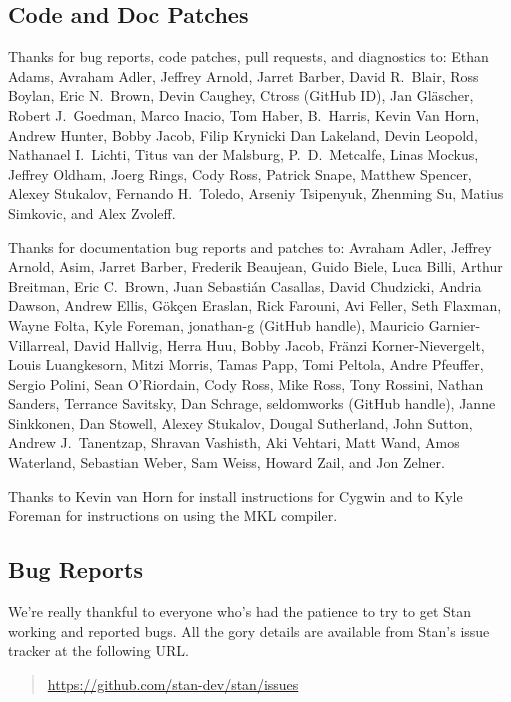 \subsection*{Code  and Doc Patches}

Thanks for bug reports, code patches, pull requests, and diagnostics
to: 
Ethan Adams, 
Avraham Adler,
Jeffrey Arnold, 
Jarret Barber, 
David R.~Blair, 
Ross Boylan, 
Eric N.~Brown, 
Devin Caughey, 
Ctross (GitHub ID), 
Jan Gl\"ascher,
Robert J.\ Goedman, 
Marco Inacio, 
Tom Haber,
B.~Harris, 
Kevin Van Horn, 
Andrew Hunter,
Bobby Jacob, 
Filip Krynicki
Dan Lakeland, 
Devin Leopold, 
Nathanael I.~Lichti,
Titus van der Malsburg,
P.~D.~Metcalfe, 
Linas Mockus,
Jeffrey Oldham, 
Joerg Rings,
Cody Ross,
Patrick Snape,
Matthew Spencer,
Alexey Stukalov,
Fernando H.~Toledo, 
Arseniy Tsipenyuk,
Zhenming Su,
Matius Simkovic, and
Alex Zvoleff.

Thanks for documentation bug reports and patches to: 
Avraham Adler,
Jeffrey Arnold,
Asim, 
Jarret Barber, 
Frederik Beaujean,
Guido Biele,
Luca Billi, 
Arthur Breitman,
Eric C.~Brown, 
Juan Sebasti\'an Casallas,
David Chudzicki,
Andria Dawson, 
Andrew Ellis,
G\"{o}k\c{c}en Eraslan,
Rick Farouni,
Avi Feller,
Seth Flaxman, 
Wayne Folta, 
Kyle Foreman,
jonathan-g (GitHub handle),
Mauricio Garnier-Villarreal,
David Hallvig,
Herra Huu,
Bobby Jacob,
Fr\"anzi Korner-Nievergelt,
Louis Luangkesorn, 
Mitzi Morris,
Tamas Papp, 
Tomi Peltola,
Andre Pfeuffer,
Sergio Polini,
Sean O'Riordain, 
Cody Ross, 
Mike Ross, 
Tony Rossini,
Nathan Sanders, 
Terrance Savitsky,
Dan Schrage,
seldomworks (GitHub handle),
Janne Sinkkonen, 
Dan Stowell, 
Alexey Stukalov,
Dougal Sutherland, 
John Sutton,
Andrew J.~Tanentzap,
Shravan Vashisth, 
Aki Vehtari,
Matt Wand,
Amos Waterland,
Sebastian Weber, 
Sam Weiss,
Howard Zail, and
Jon Zelner.

Thanks to Kevin van Horn for install instructions for Cygwin and to
Kyle Foreman for instructions on using the MKL compiler.


\subsection*{Bug Reports}

We're really thankful to everyone who's had the patience to try
to get Stan working and reported bugs.  All the gory details are
available from Stan's issue tracker at the following URL.
%
\begin{quote}
\url{https://github.com/stan-dev/stan/issues}
\end{quote}




